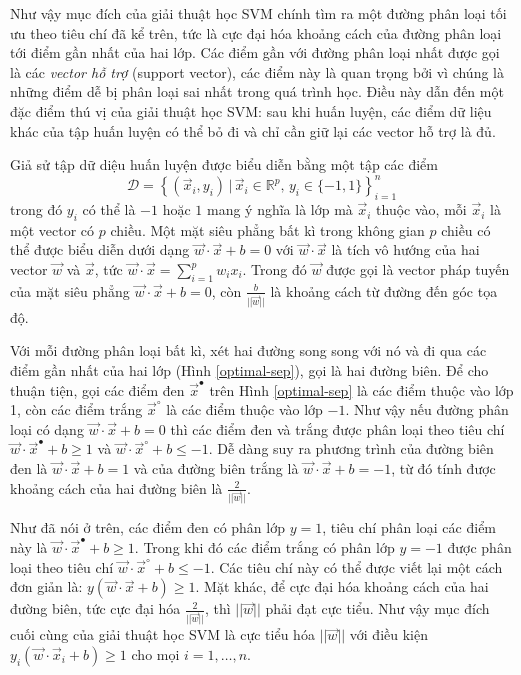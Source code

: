 Như vậy mục đích của giải thuật học SVM chính tìm ra một đường phân loại tối ưu theo tiêu chí đã kể trên, tức là cực đại hóa khoảng cách của đường phân loại tới điểm gần nhất của hai lớp. Các điểm gần với đường phân loại nhất được gọi là các \emph{vector hỗ trợ} (support vector), các điểm này là quan trọng bởi vì chúng là những điểm dễ bị phân loại sai nhất trong quá trình học. Điều này dẫn đến một đặc điểm thú vị của giải thuật học SVM: sau khi huấn luyện, các điểm dữ liệu khác của tập huấn luyện có thể bỏ đi và chỉ cần giữ lại các vector hỗ trợ là đủ.

Giả sử tập dữ diệu huấn luyện được biểu diễn bằng một tập các điểm \[\mathcal{D}=\left\{(\vec{x}_i,y_i)\,|\,\vec{x}_i\in\mathbb{R}^p,\,y_i\in\{-1,1\}\right\}_{i=1}^{n}\] trong đó $y_i$ có thể là $-1$ hoặc $1$ mang ý nghĩa là lớp mà $\vec{x}_i$ thuộc vào, mỗi $\vec{x}_i$ là một vector có $p$ chiều. Một mặt siêu phẳng bất kì trong không gian $p$ chiều có thể được biểu diễn dưới dạng $\vec{w}\cdot\vec{x}+b=0$ với $\vec{w}\cdot\vec{x}$ là tích vô hướng của hai vector $\vec{w}$ và $\vec{x}$, tức $\vec{w}\cdot\vec{x}=\sum_{i=1}^{p}w_ix_i$. Trong đó $\vec{w}$ được gọi là vector pháp tuyến của mặt siêu phẳng $\vec{w}\cdot\vec{x}+b=0$, còn $\frac{b}{||\vec{w}||}$ là khoảng cách từ đường đến góc tọa độ.

Với mỗi đường phân loại bất kì, xét hai đường song song với nó và đi qua các điểm gần nhất của hai lớp (Hình \ref{optimal-sep}), gọi là hai đường biên. Để cho thuận tiện, gọi các điểm đen $\vec{x}^\bullet$ trên Hình \ref{optimal-sep} là các điểm thuộc vào lớp 1, còn các điểm trắng $\vec{x}^\circ$ là các điểm thuộc vào lớp $-1$. Như vậy nếu đường phân loại có dạng $\vec{w}\cdot\vec{x}+b=0$ thì các điểm đen và trắng được phân loại theo tiêu chí $\vec{w}\cdot\vec{x}^\bullet+b\geq1$ và $\vec{w}\cdot\vec{x}^\circ+b\leq-1$. Dễ dàng suy ra phương trình của đường biên đen là $\vec{w}\cdot\vec{x}+b=1$ và của đường biên trắng là $\vec{w}\cdot\vec{x}+b=-1$, từ đó tính được khoảng cách của hai đường biên là $\frac{2}{||\vec{w}||}$.

Như đã nói ở trên, các điểm đen có phân lớp $y=1$, tiêu chí phân loại các điểm này là $\vec{w}\cdot\vec{x}^\bullet+b\geq1$. Trong khi đó các điểm trắng có phân lớp $y=-1$ được phân loại theo tiêu chí $\vec{w}\cdot\vec{x}^\circ+b\leq-1$. Các tiêu chí này có thể được viết lại một cách đơn giản là: $y(\vec{w}\cdot\vec{x}+b)\geq1$. Mặt khác, để cực đại hóa khoảng cách của hai đường biên, tức cực đại hóa $\frac{2}{||\vec{w}||}$, thì $||\vec{w}||$ phải đạt cực tiểu. Như vậy mục đích cuối cùng của giải thuật học SVM là cực tiểu hóa $||\vec{w}||$ với điều kiện $y_i(\vec{w}\cdot\vec{x}_i+b)\geq1$ cho mọi $i=1,\dots,n$.

